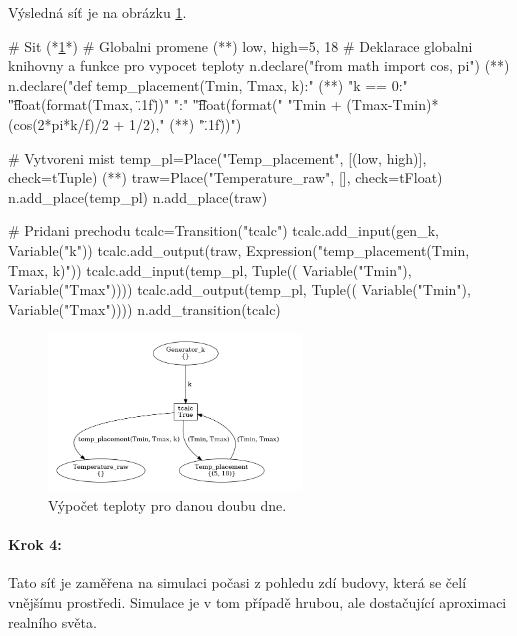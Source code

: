 Výsledná síť je na obrázku \ref{therm-calc-viz}.

\begin{python}
  # Sit (*\ref{therm-calc-viz}*)
  # Globalni promene (*\label{code:therm-calc-draw}*)
  low, high=5, 18
  # Deklarace globalni knihovny a funkce pro vypocet teploty
  n.declare("from math import cos, pi") (*\label{code:decl-libs}*)
  n.declare("def temp_placement(Tmin, Tmax, k):" (*\label{code:decl-func}*)
  "\n\tif k == 0:"
  "\n\t\treturn float(format(Tmax, \".1f\"))"
  "\n\telse:"
  "\n\t\treturn float(format("
  "Tmin + (Tmax-Tmin)*(cos(2*pi*k/f)/2 + 1/2)," (*\label{code:lib-import-usage}*)
  "\".1f\"))")

  # Vytvoreni mist
  temp_pl=Place("Temp_placement", [(low, high)], check=tTuple) (*\label{code:temp_pl}*)
  traw=Place("Temperature_raw", [], check=tFloat)
  n.add_place(temp_pl)
  n.add_place(traw)

  # Pridani prechodu
  tcalc=Transition("tcalc")
  tcalc.add_input(gen_k, Variable("k"))
  tcalc.add_output(traw, Expression("temp_placement(Tmin, Tmax, k)"))
  tcalc.add_input(temp_pl, Tuple((
    Variable("Tmin"), Variable("Tmax"))))
  tcalc.add_output(temp_pl, Tuple((
    Variable("Tmin"), Variable("Tmax"))))
  n.add_transition(tcalc)
\end{python}

\begin{figure}[htb]
  \centering
  \includegraphics[width=0.6\textwidth]{obrazky-figures/calc.png}
  \caption{Výpočet teploty pro danou doubu dne.}
  \label{therm-calc-viz}
\end{figure}

\paragraph{Krok 4:}

Tato síť je zaměřena na simulaci počasi z pohledu zdí budovy, která se čelí vnějšímu prostředi. Simulace je v tom případě hrubou, ale dostačující aproximaci realního světa.

